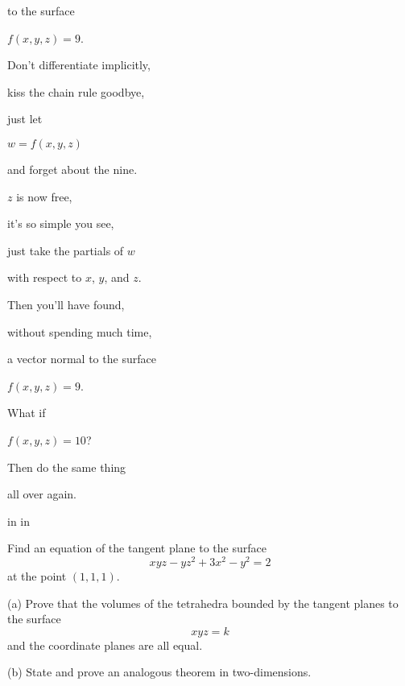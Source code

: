 \documentclass{ximera}
\newcommand{\pskip}{\vskip 0.1 in}
\begin{document}
to the surface

$f(x,y,z)=9$.

Don't differentiate implicitly,

kiss the chain rule goodbye,

just let 

$w=f(x,y,z)$

and forget about the nine.

$z$ is now free,

it's so simple you see,

just take the partials of $w$

with respect to $x$, $y$, and $z$.

Then you'll have found,

without spending much time,

a vector normal to the surface

$f(x,y,z) = 9$.

What if 

$f(x,y,z) = 10$?

Then do the same thing

all over again.


\pskip\pskip

\begin{question} \label{Qdfbtt44}
Find an equation of the tangent plane to the surface
\[
    xyz - yz^2 +3x^2 -y^2 = 2
\]
at the point $(1,1,1)$.
\end{question}

\begin{question}  \label{Q435r4gt}
(a) Prove that the volumes of the tetrahedra bounded by the tangent planes to the surface
\[
    xyz = k
\]
and the coordinate planes are all equal.

(b) State and prove an analogous theorem in two-dimensions.
\end{question}
\end{document}
